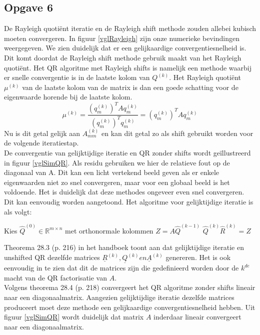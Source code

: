 \documentclass[a4paper, 12pt, titlepage]{report}
\begin{document}
\subsection{Opgave 6}
De Rayleigh quoti\"ent iteratie en de Rayleigh shift methode zouden allebei kubisch moeten convergeren. In figuur \ref{vglRayleigh} zijn onze numerieke bevindingen weergegeven. We zien duidelijk dat er een gelijkaardige convergentiesnelheid is. Dit komt doordat de Rayleigh shift methode gebruik maakt van het Rayleigh quoti\"ent. Het QR algoritme met Rayleigh shifts is namelijk een methode waarbij er snelle convergentie is in de laatste kolom van $Q^{(k)}$. Het Rayleigh quoti\"ent $\mu^{(k)}$ van de laatste kolom van de matrix is dan een goede schatting voor de eigenwaarde horende bij de laatste kolom. 
\begin{equation}
	\mu^{(k)} = \frac{(q^{(k)}_m)^TAq^{(k)}_m}{(q^{(k)}_m)^Tq^{(k)}_m} = (q^{(k)}_m)^TAq^{(k)}_m
	\label{eqn:rayleighquotient}
\end{equation}
Nu is dit getal gelijk aan $A^{(k)}_{mm}$ en kan dit getal zo als shift gebruikt worden voor de volgende iteratiestap.\\

De convergentie van gelijktijdige iteratie en QR zonder shifts wordt ge\"illustreerd in figuur \ref{vglSimQR}. Als residu gebruiken we hier de relatieve fout op de diagonaal van A. Dit kan een licht vertekend beeld geven als er enkele eigenwaarden niet zo snel convergeren, maar voor een globaal beeld is het voldoende. Het is duidelijk dat deze methodes ongeveer even snel convergeren. Dit kan eenvoudig worden aangetoond. Het algoritme voor gelijktijdige iteratie is als volgt:

\begin{algorithmic}
 \STATE Kies $\hat{Q}^{(0)}\in \mathbb{R}^{m\times n}$ met orthonormale kolommen
 	\STATE $Z = A\hat{Q}^{(k-1)}$
 	\STATE $\hat{Q}^{(k)}\hat{R}^{(k)} = Z$
 \ENDFOR
\end{algorithmic}

Theorema 28.3 (p. 216) in het handboek toont aan dat gelijktijdige iteratie en unshifted QR dezelfde matrices $\underline{R}^{(k)},\underline{Q}^{(k)} en \underline{A}^{(k)}$ genereren. Het is ook eenvoudig in te zien dat dit de matrices zijn die gedefinieerd worden door de $k^{de}$ macht van de QR factorisatie van $A$.\\

Volgens theorema 28.4 (p. 218) convergeert het QR algoritme zonder shifts lineair naar een diagonaalmatrix. Aangezien gelijktijdige iteratie dezelfde matrices produceert moet deze methode een gelijkaardige convergentiesnelheid hebben. Uit figuur \ref{vglSimQR} wordt duidelijk dat matrix $A$ inderdaar lineair convergeert naar een diagonaalmatrix.
\end{document}
